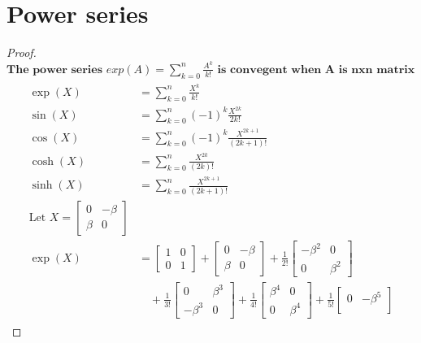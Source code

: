 \documentclass{book}
\begin{document}
\section{Power series}
\begin{proof}
$\textbf{The power series } exp(A) = \sum_{k=0}^{n} \frac{A^{k}}{k!} \textbf{ is convegent when A is nxn matrix}$ 
\begin{align*}
    \begin{split}
    \exp(X) &= \sum_{k=0}^{n} \frac{X^{k}}{k!}\\
    \sin(X) &= \sum_{k=0}^{n} (-1)^{k}\frac{X^{2k}}{2k!}\\
    \cos(X) &= \sum_{k=0}^{n} (-1)^{k}\frac{X^{2k+1}}{(2k+1)!}\\
    \cosh(X) &= \sum_{k=0}^{n} \frac{X^{2k}}{(2k)!}\\
    \sinh(X) &= \sum_{k=0}^{n} \frac{X^{2k+1}}{(2k+1)!}\\
    \text{Let } X = \begin{bmatrix}
        0 & -\beta \\
        \beta & 0 
        \end{bmatrix} \\
    \exp(X) &= 
        \begin{bmatrix}
        1 & 0 \\
        0 & 1 
        \end{bmatrix}
        +
        \begin{bmatrix}
        0 & -\beta \\
        \beta & 0 
        \end{bmatrix}
        +
        \frac{1}{2!}
        \begin{bmatrix}
        -\beta^{2} & 0 \\
        0 & \beta^{2} 
        \end{bmatrix} \\
        &\quad+
        \frac{1}{3!}
        \begin{bmatrix}
        0 & \beta^{3} \\
        -\beta^{3} & 0 
        \end{bmatrix}
        +
        \frac{1}{4!}
        \begin{bmatrix}
        \beta^{4} & 0 \\
         0 & \beta^{4} 
        \end{bmatrix}
        +
        \frac{1}{5!}
        \begin{bmatrix}
        0 & -\beta^{5}\\

\end{bmatrix}
\end{split}
\end{align*}
\end{proof}
\end{document}
